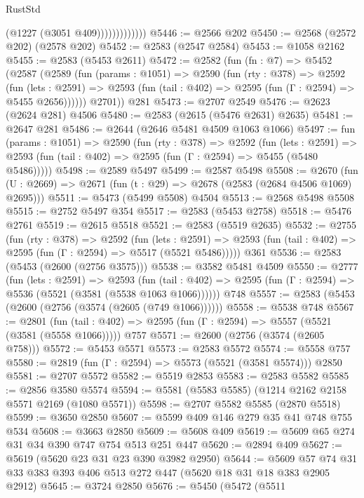 \begin{lexlean}{RustStd}
\begin{coremodule}
                          (@1227 (@3051 @409)))))))))))))
@5446 := @2566 @202
@5450 := @2568 (@2572 @202) (@2578 @202)
@5452 := @2583 (@2547 @2584)
@5453 := @1058 @2162
@5455 := @2583 (@5453 @2611)
@5472 := @2582
    (fun (fn : @7) =>
    @5452
      (@2587
        (@2589
          (fun (params : @1051) =>
          @2590
            (fun (rty : @378) =>
            @2592
              (fun (lets : @2591) =>
              @2593 (fun (tail : @402) => @2595 (fun (Γ : @2594) => @5455 @2656))))))
        @2701))
    @281
@5473 := @2707 @2549
@5476 := @2623 (@2624 @281) @4506
@5480 := @2583 (@2615 (@5476 @2631) @2635)
@5481 := @2647 @281
@5486 := @2644 (@2646 @5481 @4509 @1063 @1066)
@5497 := fun (params : @1051) =>
  @2590
    (fun (rty : @378) =>
    @2592
      (fun (lets : @2591) =>
      @2593 (fun (tail : @402) => @2595 (fun (Γ : @2594) => @5455 (@5480 @5486)))))
@5498 := @2589 @5497
@5499 := @2587 @5498
@5508 := @2670 (fun (U : @2669) => @2671 (fun (t : @29) => @2678 (@2583 (@2684 @4506 @1069) @2695)))
@5511 := @5473 (@5499 @5508) @4504
@5513 := @2568 @5498 @5508
@5515 := @2752 @5497 @354
@5517 := @2583 (@5453 @2758)
@5518 := @5476 @2761
@5519 := @2615 @5518
@5521 := @2583 (@5519 @2635)
@5532 := @2755
    (fun (rty : @378) =>
    @2592
      (fun (lets : @2591) =>
      @2593 (fun (tail : @402) => @2595 (fun (Γ : @2594) => @5517 (@5521 @5486)))))
    @361
@5536 := @2583 (@5453 (@2600 (@2756 @3575)))
@5538 := @3582 @5481 @4509
@5550 := @2777
    (fun (lets : @2591) =>
    @2593
      (fun (tail : @402) => @2595 (fun (Γ : @2594) => @5536 (@5521 (@3581 (@5538 @1063 @1066))))))
    @748
@5557 := @2583 (@5453 (@2600 (@2756 (@3574 (@2605 (@749 @1066))))))
@5558 := @5538 @748
@5567 := @2801
    (fun (tail : @402) => @2595 (fun (Γ : @2594) => @5557 (@5521 (@3581 (@5558 @1066)))))
    @757
@5571 := @2600 (@2756 (@3574 (@2605 @758)))
@5572 := @5453 @5571
@5573 := @2583 @5572
@5574 := @5558 @757
@5580 := @2819 (fun (Γ : @2594) => @5573 (@5521 (@3581 @5574))) @2850
@5581 := @2707 @5572
@5582 := @5519 @2853
@5583 := @2583 @5582
@5585 := @2856 @3580 @5574
@5594 := @5581 (@5583 @5585) (@1214 @2162 @2158 @5571 @2169 (@1080 @5571))
@5598 := @2707 @5582 @5585 (@2870 @5518)
@5599 := @3650 @2850
@5607 := @5599 @409 @146 @279 @35 @41 @748 @755 @534
@5608 := @3663 @2850
@5609 := @5608 @409
@5619 := @5609 @65 @274 @31 @34 @390 @747 @754 @513 @251 @447
@5620 := @2894 @409
@5627 := @5619 (@5620 @23 @31 @23 @390 @3982 @2950)
@5644 := @5609 @57 @74 @31 @33 @383 @393 @406 @513 @272 @447 (@5620 @18 @31 @18 @383 @2905 @2912)
@5645 := @3724 @2850
@5676 := @5450
    (@5472
      (@5511

\end{coremodule}
\end{lexlean}
